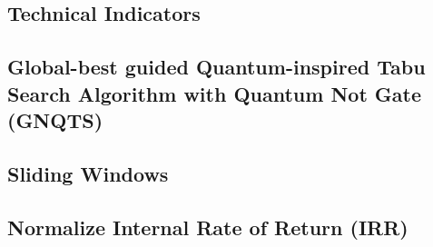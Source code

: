 \documentclass[../main.tex]{subfiles}
\begin{document}
\subsection{Technical Indicators}


\subsection{Global-best guided Quantum-inspired Tabu Search Algorithm with Quantum Not Gate (GNQTS)}


\subsection{Sliding Windows}


\subsection{Normalize Internal Rate of Return (IRR)}






\end{document}
